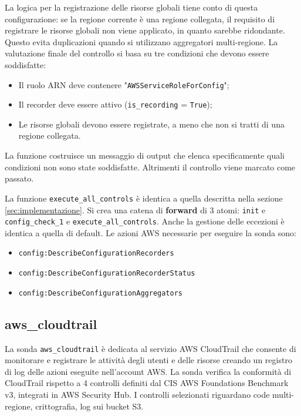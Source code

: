 La logica per la registrazione delle risorse globali tiene conto di questa configurazione: se la regione corrente è una regione collegata, il requisito di registrare le risorse globali non viene applicato, in quanto sarebbe ridondante. Questo evita duplicazioni quando si utilizzano aggregatori multi-regione. La valutazione finale del controllo si basa su tre condizioni che devono essere soddisfatte:

\begin{itemize}
\item Il ruolo ARN deve contenere "\texttt{AWSServiceRoleForConfig}";
\item Il recorder deve essere attivo (\texttt{is\_recording} = \texttt{True});
\item Le risorse globali devono essere registrate, a meno che non si tratti di una regione collegata.
\end{itemize}

La funzione costruisce un messaggio di output che elenca specificamente quali condizioni non sono state soddisfatte. Altrimenti il controllo viene marcato come passato. 

La funzione \texttt{execute\_all\_controls} è identica a quella descritta nella sezione \ref{sec:implementazione}. Si crea una catena di \textbf{forward} di 3 atomi: \texttt{init} e \texttt{config\_check\_1} e \texttt{execute\_all\_controls}. Anche la gestione delle eccezioni è identica a quella di default.
Le azioni AWS necessarie per eseguire la sonda sono:
\begin{itemize}
    \item \texttt{config:DescribeConfigurationRecorders}
    \item \texttt{config:DescribeConfigurationRecorderStatus}
    \item \texttt{config:DescribeConfigurationAggregators}
\end{itemize}

\subsection{aws\_cloudtrail}
\label{sec:cloudtrail}

La sonda \texttt{aws\_cloudtrail} è dedicata al servizio AWS CloudTrail che consente di monitorare e registrare le attività degli utenti e delle risorse creando un registro di log delle azioni eseguite nell'account AWS. La sonda verifica la conformità di CloudTrail rispetto a 4 controlli definiti dal CIS AWS Foundations Benchmark v3, integrati in AWS Security Hub. I controlli selezionati riguardano code multi-regione, crittografia, log sui bucket S3.

